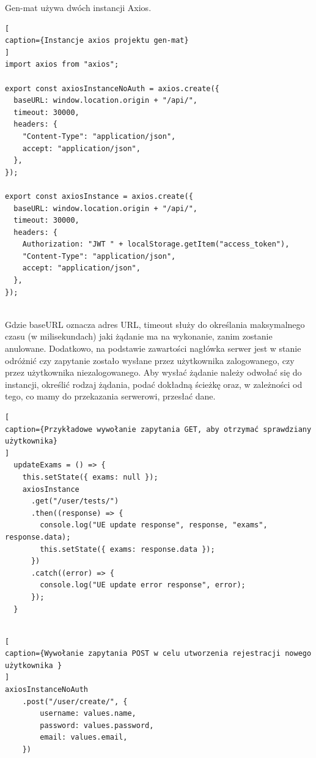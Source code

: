 \documentclass[oneside,polski,logo,indent]{amuthesis}
\begin{document}

Gen-mat używa dwóch instancji Axios.

\begin{lstlisting}[
caption={Instancje axios projektu gen-mat}
]
import axios from "axios";

export const axiosInstanceNoAuth = axios.create({
  baseURL: window.location.origin + "/api/",
  timeout: 30000,
  headers: {
    "Content-Type": "application/json",
    accept: "application/json",
  },
});

export const axiosInstance = axios.create({
  baseURL: window.location.origin + "/api/",
  timeout: 30000,
  headers: {
    Authorization: "JWT " + localStorage.getItem("access_token"),
    "Content-Type": "application/json",
    accept: "application/json",
  },
});


\end{lstlisting}

Gdzie baseURL oznacza adres URL, timeout służy do określania maksymalnego czasu (w milisekundach) jaki żądanie ma na wykonanie, zanim zostanie anulowane. Dodatkowo, na podstawie zawartości nagłówka serwer jest w stanie odróżnić czy zapytanie zostało wysłane przez użytkownika zalogowanego, czy przez użytkownika niezalogowanego. Aby wysłać żądanie należy  odwołać się do instancji, określić rodzaj żądania, podać dokładną ścieżkę oraz, w zależności od tego, co mamy do przekazania serwerowi, przesłać dane.

\begin{lstlisting}[
caption={Przykładowe wywołanie zapytania GET, aby otrzymać sprawdziany użytkownika}
]
  updateExams = () => {
    this.setState({ exams: null });
    axiosInstance
      .get("/user/tests/")
      .then((response) => {
        console.log("UE update response", response, "exams", response.data);
        this.setState({ exams: response.data });
      })
      .catch((error) => {
        console.log("UE update error response", error);
      });
  }


\end{lstlisting}

\begin{lstlisting}[
caption={Wywołanie zapytania POST w celu utworzenia rejestracji nowego użytkownika }
]
axiosInstanceNoAuth
	.post("/user/create/", {
		username: values.name,
		password: values.password,
		email: values.email,
	})


\end{lstlisting}
\end{document}
